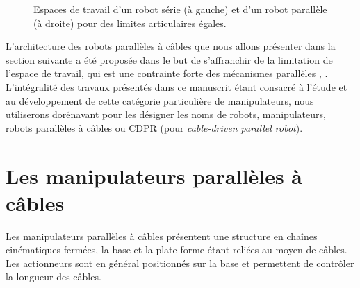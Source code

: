 \begin{figure}[!ht]
  \centering
\hfill
    \caption{\footnotesize{Espaces de travail d'un robot série (\`a gauche) et 
d'un robot parall\`ele (\`a droite) pour des limites articulaires \'egales.}}
\label{intro:fig3b}
\end{figure}

L'architecture des robots parallèles à c\^ables que nous allons présenter dans 
la section suivante a été proposée dans le but de s'affranchir de la limitation 
de l'espace de travail, qui est une contrainte forte des mécanismes parallèles 
\cite{journals/jfr/AlbusBD93}, \cite{1985:Landsberger.Sheridan*1}. L'intégralité 
des travaux présentés dans ce manuscrit étant consacré à l'étude et au 
développement de cette catégorie particulière de manipulateurs, nous utiliserons 
dorénavant pour les désigner les noms de robots, manipulateurs, robots 
parallèles à câbles ou CDPR (pour {\it cable-driven parallel robot}).

\section{Les manipulateurs parallèles à câbles} \label{chap0-1}

Les manipulateurs parallèles à câbles présentent une structure en chaînes 
cinéma\-tiques fermées, la base et la plate-forme étant reliées au moyen de 
câbles. Les actionneurs sont en général positionnés sur la base et permettent de 
contrôler la longueur des câbles.

